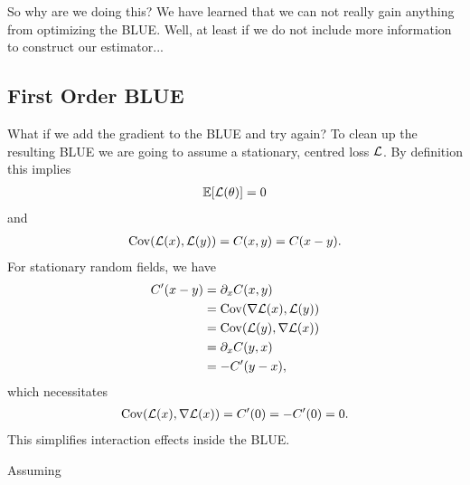 So why are we doing this? We have learned that we can not really gain
anything from optimizing the BLUE. Well, at least if we do not include more
information to construct our estimator...

\subsection{First Order BLUE}

What if we add the gradient to the BLUE and try again? To clean up the resulting
BLUE we are going to assume a stationary, centred loss \(\mathcal{L}\). By definition
this implies
\begin{align*}
	\mathbb{E}[\mathcal{L}(\theta)] = 0
\end{align*}
and
\begin{align*}
	\operatorname{Cov}(\mathcal{L}(x), \mathcal{L}(y)) = C(x,y) = C(x-y).
\end{align*}
For stationary random fields, we have 
\begin{align*}
	C'(x-y)
	&= \partial_x C(x,y)\\
	&= \operatorname{Cov}(\nabla\mathcal{L}(x), \mathcal{L}(y))\\
	&= \operatorname{Cov}(\mathcal{L}(y), \nabla\mathcal{L}(x))\\
	&= \partial_x C(y,x)\\
	&= - C'(y-x),
\end{align*}
which necessitates
\begin{align*}
	\operatorname{Cov}(\mathcal{L}(x), \nabla\mathcal{L}(x)) = C'(0) = - C'(0) = 0.
\end{align*}
This simplifies interaction effects inside the BLUE.

\begin{lemma}
	Assuming
\end{lemma}


